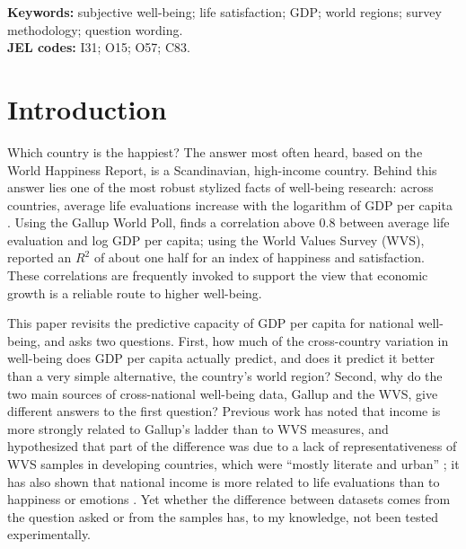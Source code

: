 \documentclass[12pt]{article}
\newif\ifblind
\begin{document}
\noindent\textbf{Keywords:} subjective well-being; life satisfaction; GDP; world regions; survey methodology; question wording.\\
\noindent\textbf{JEL codes:} I31; O15; O57; C83.

\ifblind
  \doublespacing
  \linenumbers
\else
  \tableofcontents
\fi

\clearpage


\section{Introduction}\label{sec:intro}

Which country is the happiest? The answer most often heard, based on the World Happiness Report, is a Scandinavian, high-income country. Behind this answer lies one of the most robust stylized facts of well-being research: across countries, average life evaluations increase with the logarithm of GDP per capita \citep{deaton_income_2008,stevenson_economic_2008,sacks_new_2012}. Using the Gallup World Poll, \citet{deaton_income_2008} finds a correlation above 0.8 between average life evaluation and log GDP per capita; using the World Values Survey (WVS), \citet{inglehart_genes_2000} reported an $R^2$ of about one half for an index of happiness and satisfaction. These correlations are frequently invoked to support the view that economic growth is a reliable route to higher well-being.

This paper revisits the predictive capacity of GDP per capita for national well-being, and asks two questions. First, how much of the cross-country variation in well-being does GDP per capita actually predict, and does it predict it better than a very simple alternative, the country's world region? Second, why do the two main sources of cross-national well-being data, Gallup and the WVS, give different answers to the first question? Previous work has noted that income is more strongly related to Gallup's ladder than to WVS measures, and hypothesized that part of the difference was due to a lack of representativeness of WVS samples in developing countries, which were ``mostly literate and urban'' \citep{deaton_income_2008}; it has also shown that national income is more related to life evaluations than to happiness or emotions \citep{inglehart_development_2008,kahneman_high_2010}. Yet whether the difference between datasets comes from the question asked or from the samples has, to my knowledge, not been tested experimentally.
\end{document}
